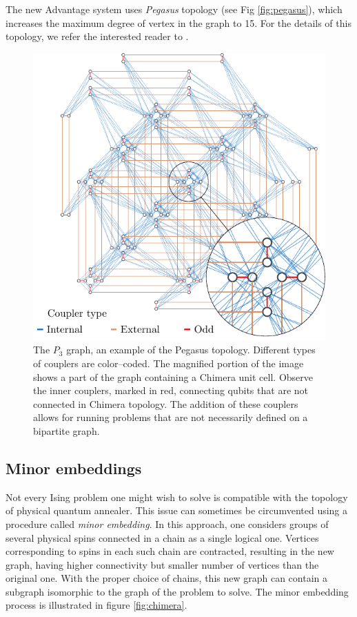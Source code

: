 The new Advantage system uses \emph{Pegasus} topology (see Fig \ref{fig:pegasus}), which increases
the maximum degree of vertex in the graph to 15. For the details of this topology, we refer the interested
reader to \cite{boothby}.


\begin{figure}
    \includegraphics[width=\textwidth]{figures/pegasus}
    \caption{
        The $P_3$ graph, an example of the Pegasus topology. Different types of couplers are
        color--coded. The magnified portion of the image shows a part of the graph containing a
        Chimera unit cell. Observe the inner couplers, marked in red, connecting qubits that are not
        connected in Chimera topology. The addition of these couplers allows for running problems
        that are not necessarily defined on a bipartite graph.
    }
\end{figure}
\subsection{Minor embeddings}

Not every Ising problem one might wish to solve is compatible with the topology of physical quantum annealer. This issue can sometimes be circumvented using a procedure called \emph{minor embedding}. In this approach, one considers groups of several physical spins connected in a chain as a single logical one. Vertices corresponding to spins in each such chain are contracted, resulting in the new graph, having higher connectivity but smaller number of vertices than the original one. With the proper choice of chains, this new graph can contain a subgraph isomorphic to the graph of the problem to solve. The minor embedding process is illustrated in figure \ref{fig:chimera}.

